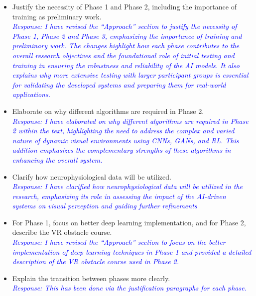 \documentclass[10pt]{article}
\begin{document}
\begin{itemize}
  \item Justify the necessity of Phase 1 and Phase 2, including the importance of training as preliminary work.\\
        \textcolor{blue}{\textit{Response: I have revised the ``Approach''
            section to justify the necessity of Phase 1, Phase 2 and Phase 3,
            emphasizing the importance of training and preliminary work. The changes
            highlight how each phase contributes to the overall research objectives
            and the foundational role of initial testing and training in ensuring
            the robustness and reliability of the AI models. It also explains why
            more extensive testing with larger participant groups is essential for validating the developed systems and preparing them for real-world applications.}}

  \item Elaborate on why different algorithms are required in Phase 2.\\
        \textcolor{blue}{\textit{Response:  I have elaborated on why different algorithms are required in Phase 2 within the text, highlighting the need to address the complex and varied nature of dynamic visual environments using CNNs, GANs, and RL\@. This addition emphasizes the complementary strengths of these algorithms in enhancing the overall system.}}

  \item Clarify how neurophysiological data will be utilized.\\
        \textcolor{blue}{\textit{Response: I have clarified how neurophysiological data will be utilized in the research, emphasizing its role in assessing the impact of the AI-driven systems on visual perception and guiding further refinements}}

  \item For Phase 1, focus on better deep learning implementation, and for Phase 2, describe the VR obstacle course.\\
        \textcolor{blue}{\textit{Response: I have revised the ``Approach'' section to focus on the better implementation of deep learning techniques in Phase 1 and provided a detailed description of the VR obstacle course used in Phase 2.}}

  \item Explain the transition between phases more clearly.\\
        \textcolor{blue}{\textit{Response: This has been done via the
            justification paragraphs for each phase.}}


\end{itemize}
\end{document}
